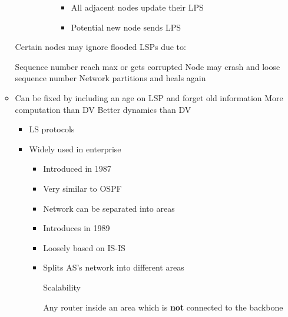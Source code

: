 \begin{itemize}
\begin{itemize}
\begin{itemize}
\begin{itemize}
\begin{itemize}
\begin{itemize}
                                        \item All adjacent nodes update their LPS
                                        \item Potential new node sends LPS
                                    \end{itemize}
                            \end{itemize}
                    \end{itemize}
            \end{itemize}
        \icon Certain nodes may ignore flooded LSPs due to:
            \begin{itemize}
                \icon Sequence number reach max or gets corrupted
                \icon Node may crash and loose sequence number
                \icon Network partitions and heals again
            \end{itemize}
        \item Can be fixed by including an age on LSP and forget old information
        \icon More computation than DV
        \ipro Better dynamics than DV
            \begin{itemize}
                \item LS protocols
                \item Widely used in enterprise
                    \begin{itemize}
                        \item Introduced in 1987
                        \item Very similar to OSPF
                        \item Network can be separated into areas
                    \end{itemize}
                    \begin{itemize}
                        \item Introduces in 1989
                        \item Loosely based on IS-IS
                        \item Splits AS's network into different areas
                            \begin{itemize}
                                \ipro Scalability
                            \end{itemize}
                         Any router inside an area which is \textbf{not} connected to the backbone

\end{itemize}
\end{itemize}
\end{itemize}
\end{itemize}
